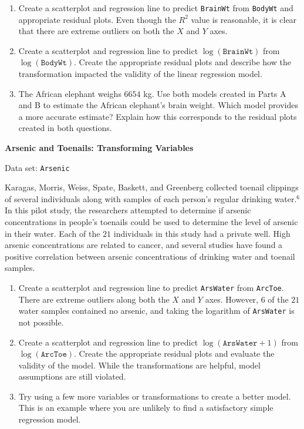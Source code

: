 \documentclass[
]{report}
\begin{document}
\begin{list}{E..}{ \setlength{\itemsep}{1.2em}}
    \begin{enumerate}
      \item Create a scatterplot and regression line to predict \texttt{BrainWt} from \texttt{BodyWt} and appropriate residual plots. Even though the $R^2$ value is reasonable, it is clear that there are extreme outliers on both the $X$ and $Y$ axes.
      \item Create a scatterplot and regression line to predict $\log(\texttt{BrainWt})$ from $\log(\texttt{BodyWt})$. Create the appropriate residual plots and describe how the transformation impacted the validity of the linear regression model.
      \item The African elephant weighs $6654$ kg. Use both models created in Parts A and B to estimate the African elephant’s brain weight. Which model provides a more accurate estimate? Explain how this corresponds to the residual plots created in both questions.
    \end{enumerate}

  \item \textbf{Arsenic and Toenails: Transforming Variables}

Data set: \texttt{Arsenic}

Karagas, Morris, Weiss, Spate, Baskett, and Greenberg collected toenail clippings of several individuals along with samples of each person’s regular drinking water.$^6$ In this pilot study, the researchers attempted to determine if arsenic concentrations in people’s toenails could be used to determine the level of arsenic in their water. Each of the $21$ individuals in this study had a private well. High arsenic concentrations are related to cancer, and several studies have found a positive correlation between arsenic concentrations of drinking water and toenail samples.

    \begin{enumerate}
      \item Create a scatterplot and regression line to predict \texttt{ArsWater} from \texttt{ArcToe}. There are extreme outliers along both the $X$ and $Y$ axes. However, $6$ of the $21$ water samples contained no arsenic, and taking the logarithm of \texttt{ArsWater} is not possible.
      \item Create a scatterplot and regression line to predict $\log(\texttt{ArsWater} + 1)$ from $\log(\texttt{ArcToe})$. Create the appropriate residual plots and evaluate the validity of the model. While the transformations are helpful, model assumptions are still violated.
      \item Try using a few more variables or transformations to create a better model. This is an example where you are unlikely to find a satisfactory simple regression model.
    \end{enumerate}


\end{list}
\end{document}
